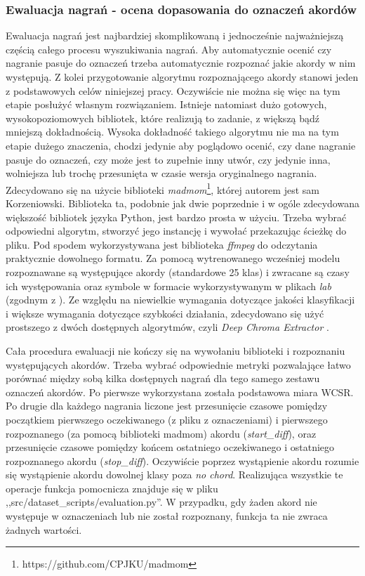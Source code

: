 \subsubsection{Ewaluacja nagrań - ocena dopasowania do oznaczeń akordów}
Ewaluacja nagrań jest najbardziej skomplikowaną i jednocześnie najważniejszą częścią całego procesu
wyszukiwania nagrań. Aby automatycznie ocenić czy nagranie pasuje do oznaczeń trzeba automatycznie
rozpoznać jakie akordy w nim występują. Z kolei przygotowanie algorytmu rozpoznającego akordy
stanowi jeden z podstawowych celów niniejszej pracy. Oczywiście nie można się więc na tym etapie
posłużyć własnym rozwiązaniem. Istnieje natomiast dużo gotowych, wysokopoziomowych bibliotek, które
realizują to zadanie, z większą bądź mniejszą dokładnością. Wysoka dokładność takiego algorytmu nie
ma na tym etapie dużego znaczenia, chodzi jedynie aby poglądowo ocenić, czy dane nagranie pasuje do
oznaczeń, czy może jest to zupełnie inny utwór, czy jedynie inna, wolniejsza lub trochę przesunięta
w czasie wersja oryginalnego nagrania. Zdecydowano się na użycie biblioteki
\emph{madmom}\footnote{https://github.com/CPJKU/madmom}, której autorem jest sam Korzeniowski.
Biblioteka ta, podobnie jak dwie poprzednie i w ogóle zdecydowana większość bibliotek języka Python,
jest bardzo prosta w użyciu. Trzeba wybrać odpowiedni algorytm, stworzyć jego instancję i wywołać
przekazując ścieżkę do pliku. Pod spodem wykorzystywana jest biblioteka \emph{ffmpeg} do odczytania
praktycznie dowolnego formatu. Za pomocą wytrenowanego wcześniej modelu rozpoznawane są występujące
akordy (standardowe 25 klas) i zwracane są czasy ich występowania oraz symbole w formacie
wykorzystywanym w plikach \emph{lab} (zgodnym z \cite{harte_towards_nodate}). Ze względu na
niewielkie wymagania dotyczące jakości klasyfikacji i większe wymagania dotyczące szybkości
działania, zdecydowano się użyć prostszego z dwóch dostępnych algorytmów, czyli \emph{Deep Chroma
Extractor} \cite{korzeniowski_feature_2016}.

Cała procedura ewaluacji nie kończy się na wywołaniu biblioteki i rozpoznaniu występujących akordów.
Trzeba wybrać odpowiednie metryki pozwalające łatwo porównać między sobą kilka dostępnych nagrań dla
tego samego zestawu oznaczeń akordów. Po pierwsze wykorzystana została podstawowa miara WCSR. Po drugie
dla każdego nagrania liczone jest przesunięcie czasowe pomiędzy początkiem pierwszego oczekiwanego
(z pliku z oznaczeniami) i pierwszego rozpoznanego (za pomocą biblioteki madmom) akordu
(\emph{start\_diff}), oraz przesunięcie czasowe pomiędzy końcem ostatniego oczekiwanego i ostatniego
rozpoznanego akordu (\emph{stop\_diff}). Oczywiście poprzez wystąpienie akordu rozumie się
wystąpienie akordu dowolnej klasy poza \emph{no chord}. Realizująca wszystkie te operacje funkcja
pomocnicza znajduje się w pliku ,,src/dataset\_scripts/evaluation.py''. W przypadku, gdy żaden akord
nie występuje w oznaczeniach lub nie został rozpoznany, funkcja ta nie zwraca żadnych wartości.

